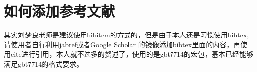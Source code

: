 \chapter{如何添加参考文献}

\par 其实刘梦良老师是建议使用bibitem的方式的，但是由于本人还是习惯使用bibtex,请使用者自行利用jabref或者Google  Scholar 的镜像添加bibtex里面的内容，再使用cite进行引用，本人就不过多的赘述了\cite{朱建章2016遥感大数据研究现状与发展趋势}，使用的是gbt7714的宏包，基本已经能够满足gbt7714的格式要求\cite{lary2016machine}。

